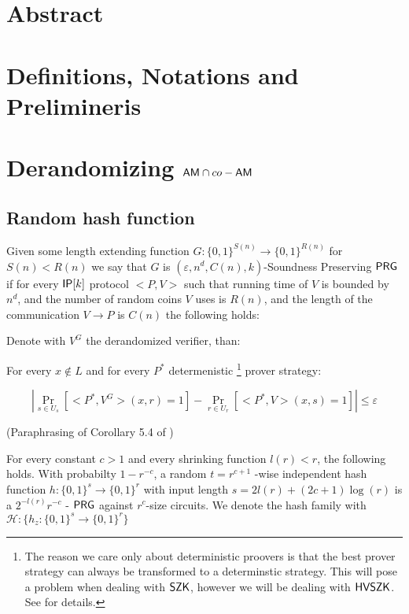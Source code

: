\documentclass[11]{article}
\begin{document}

\section{Abstract}

\section{Definitions, Notations and Prelimineris}

\section{Derandomizing $\mathsf{AM} \cap co-\mathsf{AM}$}

\subsection{Random hash function}


Given some length extending function $G:\{0,1\}^{S(n)} \to \{0,1\}^{R(n)}$ for $S(n) < R(n)$ we say that $G$ is $(\varepsilon, n^d, C(n),k)$-Soundness Preserving $\mathsf{PRG}$ if for every $\mathsf{IP}[k]$ protocol $<P,V>$ such that running time of $V$ is bounded by $n^d$, and the number of random coins $V$ uses is $R(n)$, and the length of the communication $V \to P$ is $C(n)$ the following holds:

Denote with $V^G$ the derandomized verifier, than:

For every $x \notin L$ and for every $P^*$ determenistic \footnote{The reason we care only about deterministic proovers is that the best prover strategy can always be transformed to a determinstic strategy. This will pose a problem when dealing with $\mathsf{SZK}$, however we will be dealing with $\mathsf{HVSZK}$. See \cite{DL20} for details.} prover strategy:
	
$$ |\Pr_{s \in U_s}[<P^*,V^G>(x, r) = 1] - \Pr_{r \in U_r}[<P^*, V>(x, s) = 1]| \leq \varepsilon$$
	

 (Paraphrasing of Corollary 5.4 of \cite{AASY16})

For every constant $c > 1$ and every shrinking function $l(r) < r$, the following holds. With probabilty $1-r^{-c}$, a random $t=r^{c+1}$ -wise independent hash function $h: \{0,1\}^s \to \{0,1\}^r$ with input length $s = 2l(r) + (2c + 1)\log(r)$ is a $2^{-l(r)}r^{-c}$ - $\mathsf{PRG}$ against $r^c$-size circuits. We denote the hash family with $\mathcal{H}: \{h_z: \{0,1\}^s \to \{0,1\}^r\}$
\end{document}
